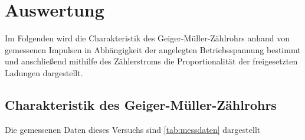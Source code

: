 \section{Auswertung}
\label{sec:Auswertung}

Im Folgenden wird die Charakteristik des Geiger-Müller-Zählrohrs anhand von gemessenen Impulsen 
in Abhängigkeit der angelegten Betriebsspannung bestimmt und anschließend mithilfe des
Zählerstroms die Proportionalität der freigesetzten Ladungen dargestellt.

\subsection{Charakteristik des Geiger-Müller-Zählrohrs}

Die gemessenen Daten dieses Versuchs sind \autoref{tab:messdaten} dargestellt

